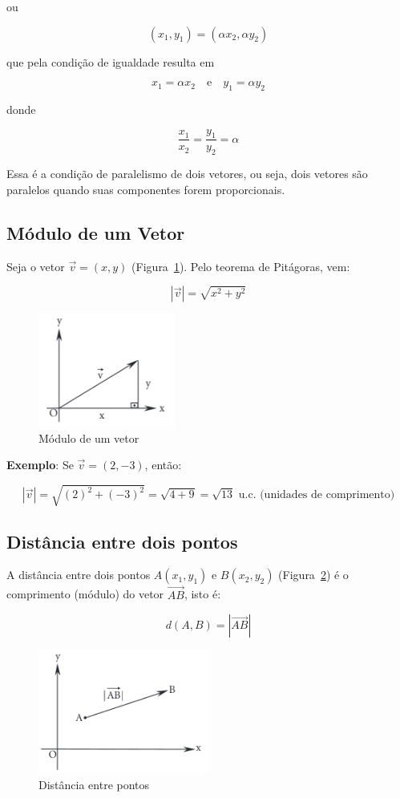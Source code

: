 ou

\[
  (x_1, y_1) = (\alpha x_2, \alpha y_2)
\]

que pela condição de igualdade resulta em

\[
  x_1 = \alpha x_2 \quad \text{e} \quad y_1 = \alpha y_2
\]

donde

\[
  \frac{x_1}{x_2} = \frac{y_1}{y_2} = \alpha
\]

Essa é a condição de paralelismo de dois vetores, ou seja, dois vetores são
paralelos quando suas componentes forem proporcionais.

\subsection{Módulo de um Vetor}

Seja o vetor $\vec{v} = (x, y)$ (Figura~\ref{fig:fig1.51}). Pelo teorema de
Pitágoras, vem:

\[
 |\vec{v}| = \sqrt{x^2 + y^2}
\]

\begin{figure}[H]
  \centering
  \includegraphics[width=0.4\textwidth]{./fig/fig1.51.png}
  \caption{Módulo de um vetor}\label{fig:fig1.51}
\end{figure}

\textbf{Exemplo}: Se $\vec{v} = (2, -3)$, então:

\[
  |\vec{v}| = \sqrt{(2)^2 + (-3)^2} = \sqrt{4 + 9} = \sqrt{13} \text{ u.c.
  (unidades de comprimento)}
\]

\subsection{Distância entre dois pontos}

A distância entre dois pontos $A(x_1, y_1)$ e $B(x_2, y_2)$
(Figura~\ref{fig:fig1.52}) é o comprimento (módulo) do vetor
$\overrightarrow{AB}$, isto é:

\[
  d(A, B) = |\overrightarrow{AB}|
\]

\begin{figure}[H]
  \centering
  \includegraphics[width=0.5\textwidth]{./fig/fig1.52.png}
  \caption{Distância entre pontos}\label{fig:fig1.52}
\end{figure}

